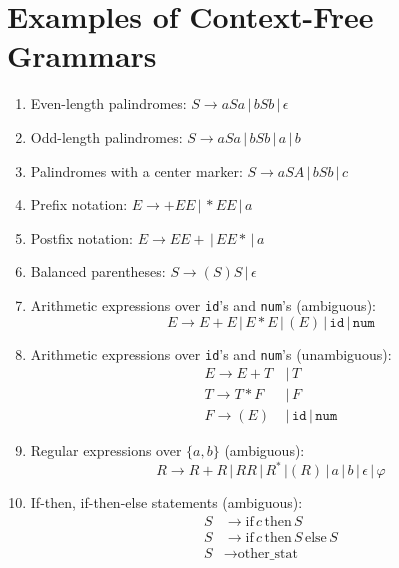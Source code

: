\documentclass[]{article}
\begin{document}
\section{Examples of Context-Free Grammars}
  \begin{enumerate}
    \item Even-length palindromes: $S \rightarrow aSa \, | \, bSb \, | \, 
    \epsilon$
    \item Odd-length palindromes: $S \rightarrow aSa \, | \, bSb \, | \, a \, | 
    \, b$
    \item Palindromes with a center marker: $S \rightarrow aSA \, | \, bSb \, | 
    \, c$
    \item Prefix notation: $E \rightarrow  + E E \, | \, * E E \, | \, a$
    \item Postfix notation: $E \rightarrow E E + \, | \, E E * \, | \, a$
    \item Balanced parentheses: $S \rightarrow ( S ) S \, | \, \epsilon$
    \item Arithmetic expressions over \texttt{id}'s and \texttt{num}'s 
    (ambiguous):
      \[
         E \rightarrow E + E \, | \, E * E \, | \, (E) \, | \, \texttt{id} \, | 
        \, \texttt{num} 
      \]
    \item Arithmetic expressions over \texttt{id}'s and \texttt{num}'s 
    (unambiguous):
      \begin{align*}
        E \rightarrow E + T \, &| \, T \\
        T \rightarrow T * F \, &| \, F \\
        F \rightarrow ( E ) \, &| \, \texttt{id} \, | \,  \texttt{num}
      \end{align*}
    \item Regular expressions over $\{ a, b \}$ (ambiguous):
      \[
         R \rightarrow R + R \, | \, RR \, | \, R^* \, | (R) \, | \, a \, | \, b 
        \, | \, \epsilon \, | \, \varphi
      \]
    \item If-then, if-then-else statements (ambiguous):
      \begin{align*}
        S &\rightarrow \text{if} \, c \, \text{then} \, S                     \\
        S &\rightarrow \text{if} \, c \, \text{then} \, S \, \text{else} \, S \\
        S &\rightarrow \text{other\_stat}
      \end{align*}
  \end{enumerate}
  
\end{document}
